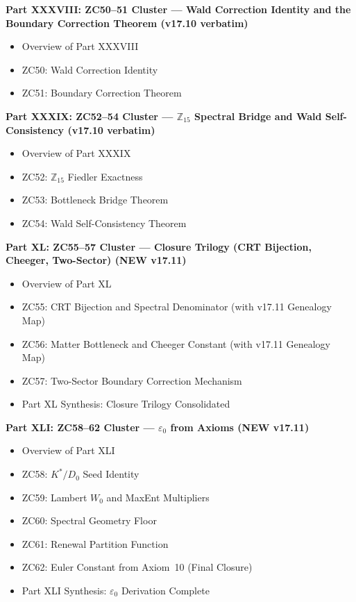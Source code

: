 \documentclass[11pt, a4paper]{article}
\begin{document}
\begin{contentsbox}[title={Part H v17.11 --- Part and Section Headers}]
\textbf{Part XXXVIII: ZC50--51 Cluster --- Wald Correction Identity
  and the Boundary Correction Theorem (v17.10 verbatim)}
\begin{itemize}[noitemsep,leftmargin=1.5em]
  \item Overview of Part XXXVIII
  \item ZC50: Wald Correction Identity
  \item ZC51: Boundary Correction Theorem
\end{itemize}

\textbf{Part XXXIX: ZC52--54 Cluster ---
  $\mathbb{Z}_{15}$ Spectral Bridge and Wald Self-Consistency
  (v17.10 verbatim)}
\begin{itemize}[noitemsep,leftmargin=1.5em]
  \item Overview of Part XXXIX
  \item ZC52: $\mathbb{Z}_{15}$ Fiedler Exactness
  \item ZC53: Bottleneck Bridge Theorem
  \item ZC54: Wald Self-Consistency Theorem
\end{itemize}

\textbf{Part XL: ZC55--57 Cluster --- Closure Trilogy
  (CRT Bijection, Cheeger, Two-Sector) (NEW v17.11)}
\begin{itemize}[noitemsep,leftmargin=1.5em]
  \item Overview of Part XL
  \item ZC55: CRT Bijection and Spectral Denominator
    (with v17.11 Genealogy Map)
  \item ZC56: Matter Bottleneck and Cheeger Constant
    (with v17.11 Genealogy Map)
  \item ZC57: Two-Sector Boundary Correction Mechanism
  \item Part XL Synthesis: Closure Trilogy Consolidated
\end{itemize}

\textbf{Part XLI: ZC58--62 Cluster ---
  $\varepsilon_0$ from Axioms (NEW v17.11)}
\begin{itemize}[noitemsep,leftmargin=1.5em]
  \item Overview of Part XLI
  \item ZC58: $K^{*}/D_0$ Seed Identity
  \item ZC59: Lambert $W_0$ and MaxEnt Multipliers
  \item ZC60: Spectral Geometry Floor
  \item ZC61: Renewal Partition Function
  \item ZC62: Euler Constant from Axiom~10 (Final Closure)
  \item Part XLI Synthesis: $\varepsilon_0$ Derivation Complete
\end{itemize}


\end{contentsbox}
\end{document}
